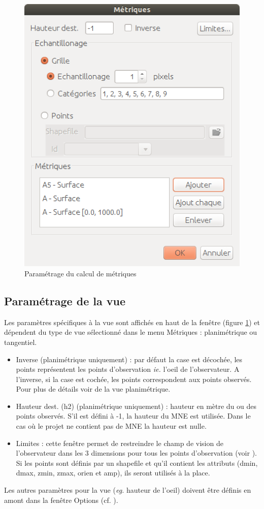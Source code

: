 \documentclass{report}
\begin{document}
\begin{figure}[H]
	\includegraphics[scale=0.5]{img/metrics-fr.png} 
	\caption{Paramétrage du calcul de métriques}
	\label{metrics_dlg}
\end{figure}

\subsection{Paramétrage de la vue}
Les paramètres spécifiques à la vue sont affichés en haut de la fenêtre (figure \ref{metrics_dlg}) et dépendent du type de vue sélectionné dans le menu Métriques : planimétrique ou tangentiel.

\begin{itemize}
	\item Inverse (planimétrique uniquement) : par défaut la case est décochée, les points représentent les points d'observation \textit{ie.} l'oeil de l'observateur. A l'inverse, si la case est cochée, les points correspondent aux points observés. Pour plus de détails voir  de la vue planimétrique.
	\item Hauteur dest. (h2) (planimétrique uniquement) : hauteur en mètre du ou des points observés. S'il est défini à -1, la hauteur du MNE est utilisée. Dans le cas où le projet ne contient pas de MNE la hauteur est nulle.
	\item Limites : cette fenêtre permet de restreindre le champ de vision de l'observateur dans les 3 dimensions pour tous les points d'observation (voir ). Si les points sont définis par un shapefile et qu'il contient les attributs (dmin, dmax, zmin, zmax, orien et amp), ils seront utilisés à la place.
\end{itemize}
Les autres paramètres pour la vue (\textit{eg.} hauteur de l'oeil) doivent être définis en amont dans la fenêtre Options (cf. ).
\end{document}
